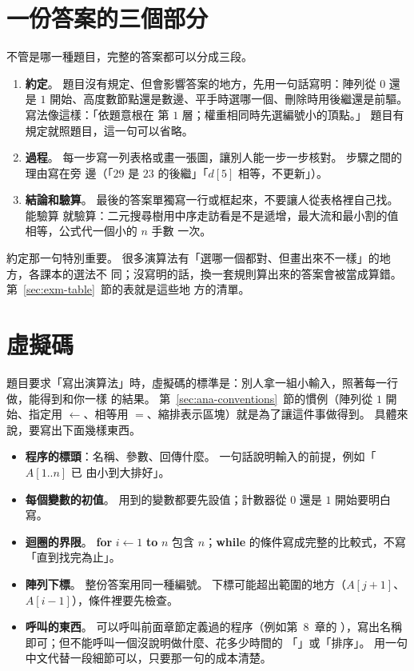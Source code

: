 \section{一份答案的三個部分}
\label{sec:exm-basics}

不管是哪一種題目，完整的答案都可以分成三段。

\begin{enumerate}
\item \textbf{約定}。 題目沒有規定、但會影響答案的地方，先用一句話寫明：陣列從 $0$ 還是 $1$
開始、高度數節點還是數邊、平手時選哪一個、刪除時用後繼還是前驅。 寫法像這樣：「依題意根在
第 $1$ 層；權重相同時先選編號小的頂點。」 題目有規定就照題目，這一句可以省略。
\item \textbf{過程}。 每一步寫一列表格或畫一張圖，讓別人能一步一步核對。 步驟之間的理由寫在旁
邊（「$29$ 是 $23$ 的後繼」「$d[5]$ 相等，不更新」）。
\item \textbf{結論和驗算}。 最後的答案單獨寫一行或框起來，不要讓人從表格裡自己找。 能驗算
就驗算：二元搜尋樹用中序走訪看是不是遞增，最大流和最小割的值相等，公式代一個小的 $n$ 手數
一次。
\end{enumerate}

約定那一句特別重要。 很多演算法有「選哪一個都對、但畫出來不一樣」的地方，各課本的選法不
同；沒寫明的話，換一套規則算出來的答案會被當成算錯。 第~\ref{sec:exm-table}~節的表就是這些地
方的清單。

\section{虛擬碼}
\label{sec:exm-pseudo}

題目要求「寫出演算法」時，虛擬碼的標準是：別人拿一組小輸入，照著每一行做，能得到和你一樣
的結果。 第~\ref{sec:ana-conventions}~節的慣例（陣列從 $1$ 開始、指定用 $\gets$、相等用
$=$、縮排表示區塊）就是為了讓這件事做得到。 具體來說，要寫出下面幾樣東西。

\begin{itemize}
\item \textbf{程序的標頭}：名稱、參數、回傳什麼。 一句話說明輸入的前提，例如「$A[1..n]$ 已
由小到大排好」。
\item \textbf{每個變數的初值}。 用到的變數都要先設值；計數器從 $0$ 還是 $1$ 開始要明白寫。
\item \textbf{迴圈的界限}。 \textbf{for} $i \gets 1$ \textbf{to} $n$ 包含 $n$；\textbf{while}
的條件寫成完整的比較式，不寫「直到找完為止」。
\item \textbf{陣列下標}。 整份答案用同一種編號。 下標可能超出範圍的地方（$A[j + 1]$、
$A[i - 1]$），條件裡要先檢查。
\item \textbf{呼叫的東西}。 可以呼叫前面章節定義過的程序（例如第~8~章的
），寫出名稱即可；但不能呼叫一個沒說明做什麼、花多少時間的
「」或「排序」。 用一句中文代替一段細節可以，只要那一句的成本清楚。
\end{itemize}

